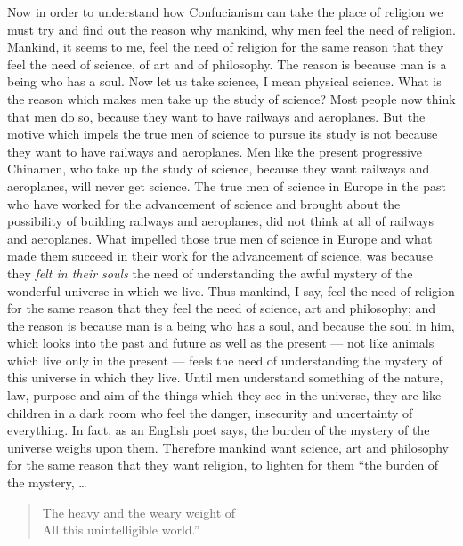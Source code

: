 Now in order to understand how Confucianism can take the place of religion we must try and find out the reason why mankind, why men feel the need of religion.
Mankind, it seems to me, feel the need of religion for the same reason that they feel the need of science, of art and of philosophy.
The reason is because man is a being who has a soul.
Now let us take science, I mean physical science.
What is the reason which makes men take up the study of science?
Most people now think that men do so, because they want to have railways and aeroplanes.
But the motive which impels the true men of science to pursue its study is not because they want to have railways and aeroplanes.
Men like the present progressive Chinamen, who take up the study of science, because they want railways and aeroplanes, will never get science.
The true men of science in Europe in the past who have worked for the advancement of science and brought about the possibility of building railways and aeroplanes, did not think at all of railways and aeroplanes.
What impelled those true men of science in Europe and what made them succeed in their work for the advancement of science, was because they \emph{felt in their souls} the need of understanding the awful mystery of the wonderful universe in which we live.
Thus mankind, I say, feel the need of religion for the same reason that they feel the need of science, art and philosophy; and the reason is because man is a being who has a soul, and because the soul in him, which looks into the past and future as well as the present --- not like animals which live only in the present --- feels the need of understanding the mystery of this universe in which they live.
Until men understand something of the nature, law, purpose and aim of the things which they see in the universe, they are like children in a dark room who feel the danger, insecurity and uncertainty of everything.
In fact, as an English poet says, the burden of the mystery of the universe weighs upon them.
Therefore mankind want science, art and philosophy for the same reason that they want religion, to lighten for them ``the burden of the mystery, \dots 
\begin{quote}\footnotesize
    The heavy and the weary weight of \\ 
    All this unintelligible world.''
\end{quote}

